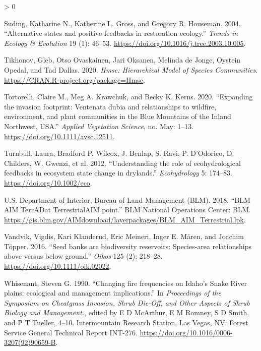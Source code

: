 \documentclass[
  12pt,
]{article}
\newlength{\cslhangindent}
\newenvironment{CSLReferences}[2] %
 {%
  \setlength{\parindent}{0pt}
  \ifodd #1 \everypar{\setlength{\hangindent}{\cslhangindent}}\ignorespaces\fi
  \ifnum #2 > 0
  \setlength{\parskip}{#2\baselineskip}
  \fi
 }%
 {}
\begin{document}
\begin{CSLReferences}{1}{0}
\leavevmode\hypertarget{ref-Suding2004}{}%
Suding, Katharine N., Katherine L. Gross, and Gregory R. Houseman. 2004.
{``{Alternative states and positive feedbacks in restoration
ecology}.''} \emph{Trends in Ecology \& Evolution} 19 (1): 46--53.
\url{https://doi.org/10.1016/j.tree.2003.10.005}.

\leavevmode\hypertarget{ref-HMSC}{}%
Tikhonov, Gleb, Otso Ovaskainen, Jari Oksanen, Melinda de Jonge, Oystein
Opedal, and Tad Dallas. 2020. \emph{Hmsc: Hierarchical Model of Species
Communities}. \url{https://CRAN.R-project.org/package=Hmsc}.

\leavevmode\hypertarget{ref-Tortorelli2020}{}%
Tortorelli, Claire M., Meg A. Krawchuk, and Becky K. Kerns. 2020.
{``{Expanding the invasion footprint: Ventenata dubia and relationships
to wildfire, environment, and plant communities in the Blue Mountains of
the Inland Northwest, USA}.''} \emph{Applied Vegetation Science}, no.
May: 1--13. \url{https://doi.org/10.1111/avsc.12511}.

\leavevmode\hypertarget{ref-Turnbull2012}{}%
Turnbull, Laura, Bradford P. Wilcox, J. Benlap, S. Ravi, P. D'Odorico,
D. Childers, W. Gwenzi, et al. 2012. {``{Understanding the role of
ecohydrological feedbacks in ecosystem state change in drylands}.''}
\emph{Ecohydrology} 5: 174--83. \url{https://doi.org/10.1002/eco}.

\leavevmode\hypertarget{ref-AIM}{}%
U.S. Department of Interior, Bureau of Land Management (BLM). 2018.
{``{BLM AIM TerrADat TerrestrialAIM point}.''} BLM National Operations
Center: BLM.
\url{https://gis.blm.gov/AIMdownload/layerpackages/BLM_AIM_Terrestrial.lpk}.

\leavevmode\hypertarget{ref-Vandvik2016}{}%
Vandvik, Vigdis, Kari Klanderud, Eric Meineri, Inger E. Måren, and
Joachim Töpper. 2016. {``{Seed banks are biodiversity reservoirs:
Species-area relationships above versus below ground}.''} \emph{Oikos}
125 (2): 218--28. \url{https://doi.org/10.1111/oik.02022}.

\leavevmode\hypertarget{ref-Whisenant1990}{}%
Whisenant, Steven G. 1990. {``{Changing fire frequencies on Idaho's
Snake River plains: ecological and management implications}.''} In
\emph{Proceedings of the Symposium on Cheatgrass Invasion, Shrub
Die-Off, and Other Aspects of Shrub Biology and Management.}, edited by
E D McArthur, E M Romney, S D Smith, and P T Tueller, 4--10.
Intermountain Research Station, Las Vegas, NV: Forest Service General
Technical Report INT-276.
\url{https://doi.org/10.1016/0006-3207(92)90659-B}.


\end{CSLReferences}
\end{document}
